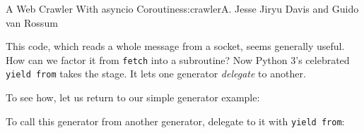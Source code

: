 \begin{aosachapter}{A Web Crawler With asyncio Coroutines}{s:crawler}{A. Jesse Jiryu Davis and Guido van Rossum}
\begin{Shaded}
\begin{Highlighting}[]
         \NormalTok{:}

             
                \NormalTok{))}

             
             
            \NormalTok{:}
\end{Highlighting}
\end{Shaded}

This code, which reads a whole message from a socket, seems generally
useful. How can we factor it from \texttt{fetch} into a subroutine? Now
Python 3's celebrated \texttt{yield from} takes the stage. It lets one
generator \emph{delegate} to another.

To see how, let us return to our simple generator example:

\begin{Shaded}
\begin{Highlighting}[]
\NormalTok{>>> } 
 
\NormalTok{(}
 
\NormalTok{(}
 
\end{Highlighting}
\end{Shaded}

To call this generator from another generator, delegate to it with
\texttt{yield from}:

\begin{Shaded}
\begin{Highlighting}[]
\NormalTok{>>> }
\NormalTok{>>> } 
  
\NormalTok{(}
\NormalTok{>>> }
\NormalTok{>>> }
\end{Highlighting}
\end{Shaded}


\end{aosachapter}
